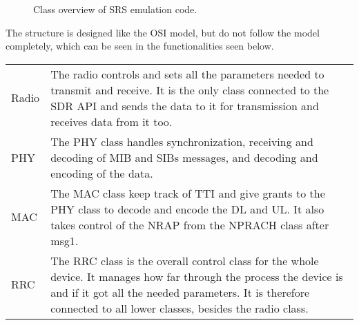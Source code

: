 
\begin{figure}[H]


\centering

\resizebox{0.5\textwidth}{!}{

}

\caption{Class overview of SRS emulation code.}

\label{fig:MassClass}

\end{figure}

The structure is designed like the OSI model, but do not follow the model completely, which can be seen in the functionalities seen below.

\begin{tabular}{l p{14cm}}
Radio & The radio controls and sets all the parameters needed to transmit and receive. It is the only class connected to the SDR API and sends the data to it for transmission and receives data from it too. \\
PHY & The PHY class handles synchronization, receiving and decoding of MIB and SIBs messages, and decoding and encoding of the data. \\
MAC & The MAC class keep track of TTI and give grants to the PHY class to decode and encode the DL and UL. It also takes control of the NRAP from the NPRACH class after msg1. \\
RRC & The RRC class is the overall control class for the whole device. It manages how far through the process the device is and if it got all the needed parameters. It is therefore connected to all lower classes, besides the radio class. \\
\end{tabular}

